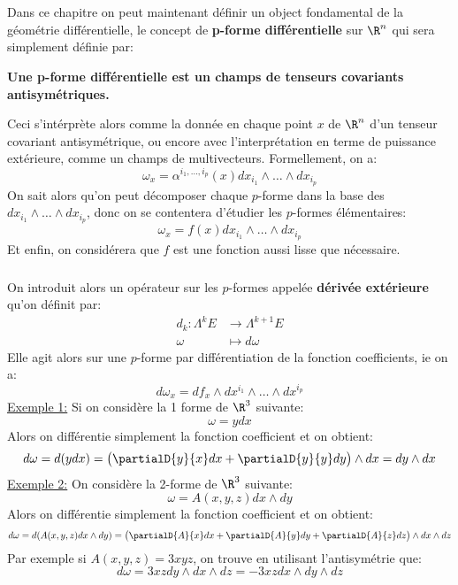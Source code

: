 \documentclass{report}
\begin{document}
   \chapter*{}
   Dans ce chapitre on peut maintenant définir un object fondamental de la géométrie différentielle, le concept de \textbf{p-forme différentielle} sur \(\R^n\) qui sera simplement définie par:
   \begin{center}
      \textbf{Une p-forme différentielle est un champs de tenseurs covariants antisymétriques.}
   \end{center}
   Ceci s'intérprète alors comme la donnée en chaque point \(x\) de \(\R^n\) d'un tenseur covariant antisymétrique, ou encore avec l'interprétation en terme de puissance extérieure, comme un champs de multivecteurs. Formellement, on a:
   \[
      \omega_x = \alpha^{{i_1, \ldots, i_p}}(x) dx_{i_1} \wedge \ldots \wedge dx_{i_p}
   \]
   On sait alors qu'on peut décomposer chaque \(p\)-forme dans la base des \(dx_{i_1} \wedge \ldots \wedge dx_{i_p}\), donc on se contentera d'étudier les \(p\)-formes élémentaires:
   \[
      \omega_x = f(x) dx_{i_1} \wedge \ldots \wedge dx_{i_p}
   \]
   Et enfin, on considérera que \(f\) est une fonction aussi lisse que nécessaire.

   \subsection*{}
   On introduit alors un opérateur sur les \(p\)-formes appelée \textbf{dérivée extérieure} qu'on définit par:
   \begin{align*}
      d_k : \Lambda^k E &\longrightarrow \Lambda^{k+1} E\\
      \omega &\longmapsto d\omega
   \end{align*}
   Elle agit alors sur une \(p\)-forme par différentiation de la fonction coefficients, ie on a:
   \[
      d\omega_x = df_x \wedge dx^{i_1} \wedge \ldots \wedge dx^{i_p}
   \]
   \uline{Exemple 1:} Si on considère la 1 forme de \(\R^3\) suivante:
   \[
      \omega = y dx 
   \]
   Alors on différentie simplement la fonction coefficient et on obtient:
   \[
      d\omega = d(ydx) = \left(\partialD{y}{x}dx + \partialD{y}{y}dy\right) \wedge dx = dy \wedge dx
   \]
   \uline{Exemple 2:} On considère la 2-forme de \(\R^3\) suivante:
   \[
      \omega = A(x, y, z)dx \wedge dy
   \]
   Alors on différentie simplement la fonction coefficient et on obtient:
   \[
      d\omega = d(A(x, y, z)dx \wedge dy) = \left(\partialD{A}{x}dx + \partialD{A}{y}dy + \partialD{A}{z}dz\right) \wedge dx \wedge dz
   \]
   Par exemple si \(A(x, y, z) = 3xyz\), on trouve en utilisant l'antisymétrie que:
   \[
      d\omega = 3xz dy \wedge dx \wedge dz = -3xz dx \wedge dy \wedge dz
   \]
\end{document}
